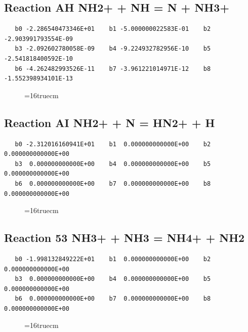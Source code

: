 \documentclass[12pt,dvipdfm]{article}
\begin{document}
\subsection{
Reaction AH NH2+ + NH = N + NH3+}
\begin{small}\begin{verbatim}
   b0 -2.286540473346E+01    b1 -5.000000022583E-01    b2 -2.903991793554E-09
   b3 -2.092602780058E-09    b4 -9.224932782956E-10    b5 -2.541818400592E-10
   b6 -4.262482993526E-11    b7 -3.961221014971E-12    b8 -1.552398934101E-13
   \end{verbatim}\end{small}
\begin{figure}[h!]
\label{n2rates}
\epsfxsize=16truecm
\end{figure}
\newpage

\subsection{
Reaction AI NH2+ + N = HN2+ + H}
\begin{small}\begin{verbatim}
   b0 -2.312016160941E+01    b1  0.000000000000E+00    b2  0.000000000000E+00
   b3  0.000000000000E+00    b4  0.000000000000E+00    b5  0.000000000000E+00
   b6  0.000000000000E+00    b7  0.000000000000E+00    b8  0.000000000000E+00
   \end{verbatim}\end{small}
\begin{figure}[h!]
\label{n2rates}
\epsfxsize=16truecm
\end{figure}
\newpage

\subsection{
Reaction 53 NH3+ + NH3 = NH4+ + NH2}
\begin{small}\begin{verbatim}
   b0 -1.998132849222E+01    b1  0.000000000000E+00    b2  0.000000000000E+00
   b3  0.000000000000E+00    b4  0.000000000000E+00    b5  0.000000000000E+00
   b6  0.000000000000E+00    b7  0.000000000000E+00    b8  0.000000000000E+00
   \end{verbatim}\end{small}
\begin{figure}[h!]
\label{n2rates}
\epsfxsize=16truecm
\end{figure}
\newpage
\end{document}
